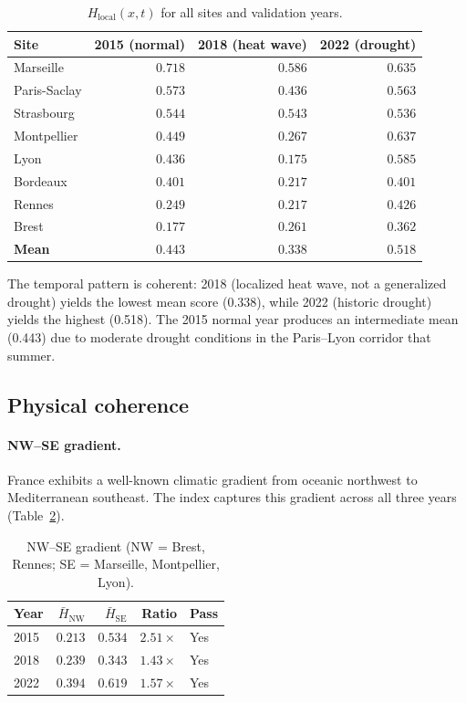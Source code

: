 \documentclass[11pt,a4paper]{article}
\begin{document}
\begin{table}[h]
\centering
\small
\caption{$H_{\text{local}}(x,t)$ for all sites and validation years.}
\label{tab:H}
\begin{tabular}{lrrr}
\toprule
Site & 2015 (normal) & 2018 (heat wave) & 2022 (drought) \\
\midrule
Marseille     & $0.718$ & $0.586$ & $0.635$ \\
Paris-Saclay  & $0.573$ & $0.436$ & $0.563$ \\
Strasbourg    & $0.544$ & $0.543$ & $0.536$ \\
Montpellier   & $0.449$ & $0.267$ & $0.637$ \\
Lyon          & $0.436$ & $0.175$ & $0.585$ \\
Bordeaux      & $0.401$ & $0.217$ & $0.401$ \\
Rennes        & $0.249$ & $0.217$ & $0.426$ \\
Brest         & $0.177$ & $0.261$ & $0.362$ \\
\midrule
\textbf{Mean} & $\mathbf{0.443}$ & $\mathbf{0.338}$ & $\mathbf{0.518}$ \\
\bottomrule
\end{tabular}
\end{table}

The temporal pattern is coherent: 2018 (localized heat wave, not a generalized drought) yields the lowest mean score (0.338), while 2022 (historic drought) yields the highest (0.518). The 2015 normal year produces an intermediate mean (0.443) due to moderate drought conditions in the Paris--Lyon corridor that summer.

\subsection{Physical coherence}

\paragraph{NW--SE gradient.} France exhibits a well-known climatic gradient from oceanic northwest to Mediterranean southeast. The index captures this gradient across all three years (Table~\ref{tab:gradient}).

\begin{table}[h]
\centering
\small
\caption{NW--SE gradient (NW = Brest, Rennes; SE = Marseille, Montpellier, Lyon).}
\label{tab:gradient}
\begin{tabular}{lrrrl}
\toprule
Year & $\bar{H}_{\text{NW}}$ & $\bar{H}_{\text{SE}}$ & Ratio & Pass \\
\midrule
2015 & $0.213$ & $0.534$ & $2.51\times$ & Yes \\
2018 & $0.239$ & $0.343$ & $1.43\times$ & Yes \\
2022 & $0.394$ & $0.619$ & $1.57\times$ & Yes \\
\bottomrule
\end{tabular}
\end{table}
\end{document}
